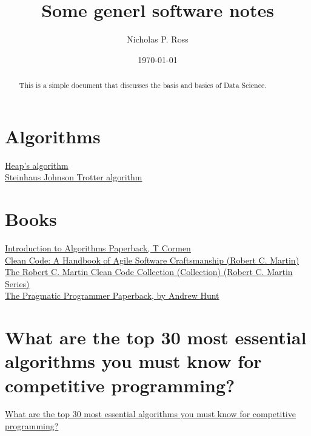 \documentclass[11pt]{article}
\begin{document}
\title{Some generl software notes}
\author{Nicholas P. Ross}
\date{\today}
\maketitle


\begin{abstract}
This is a simple document that discusses the basis and basics of Data Science. 
\end{abstract}


\tableofcontents


\newpage
\section{Algorithms}

\href{https://en.wikipedia.org/wiki/Heap\%27s_algorithm}{Heap's algorithm}\\
\href{https://en.wikipedia.org/wiki/Steinhaus\%E2\%80\%93Johnson\%E2\%80\%93Trotter_algorithm}{Steinhaus Johnson Trotter algorithm}\\


\section{Books}
\href{https://www.amazon.co.uk/Introduction-Algorithms-T-Cormen/dp/0262533057}{Introduction to Algorithms Paperback, T Cormen}\\
\href{https://www.amazon.co.uk/Clean-Code-Handbook-Software-Craftsmanship/dp/0132350882/}{Clean Code: A Handbook of Agile Software Craftsmanship (Robert C. Martin)}\\
\href{https://www.amazon.co.uk/Robert-Martin-Clean-Code-Collection-ebook/dp/B00666M59G}{The Robert C. Martin Clean Code Collection (Collection) (Robert C. Martin Series)}\\
\href{https://www.amazon.co.uk/Pragmatic-Programmer-Andrew-Hunt/dp/020161622X}{The Pragmatic Programmer Paperback, by Andrew Hunt}\\


\newpage
\section{What are the top 30 most essential algorithms you must know for competitive programming?}
\href{https://www.quora.com/What-are-the-top-30-most-essential-algorithms-you-must-know-for-competitive-programming}{What are the top 30 most essential algorithms you must know for competitive programming?}\\
\end{document}
